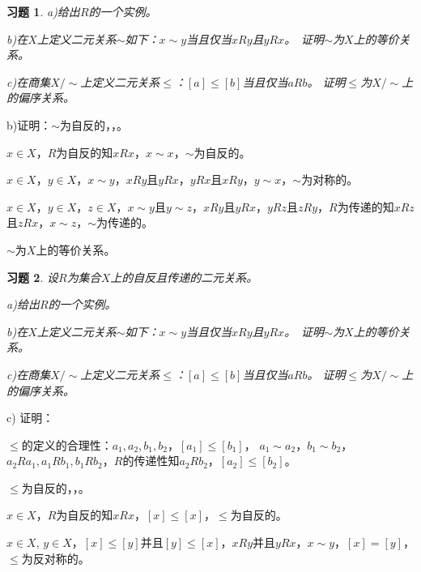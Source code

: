 \documentclass{beamer}
\newtheorem*{Exercise}{习题}
\begin{document}
\begin{CJK*}{UTF8}{gbsn}
\begin{frame}
\begin{Exercise}
  a)给出$R$的一个实例。

  b)在$X$上定义二元关系$\sim$如下：$x\sim y$当且仅当$x R y$且$y R x$。　证明$\sim$为$X$上的等价关系。

  c)在商集$X/\sim$上定义二元关系$\leq$：$[a]\leq [b]$当且仅当$aRb$。
  证明$\leq$为$X/\sim$上的偏序关系。  
\end{Exercise}

\justifying\let\raggedright\justifying\pause
b)证明：$\sim$为自反的，，。

  $x\in X$，$R$为自反的知$xRx$，$x\sim x$，$\sim$为自反的。

  $x\in X$，$y\in X$，$x\sim y$，$xRy$且$yRx$，$yRx$且$xRy$，$y\sim x$，$\sim$为对称的。

  $x\in X$，$y\in X$，$z\in X$，$x\sim y$且$y\sim z$，$xRy$且$yRx$，\pause $yRz$且$zRy$，$R$为传递的知$xRz$且$zRx$，$x\sim z$，$\sim$为传递的。

  $\sim$为$X$上的等价关系。

\end{frame}
\begin{frame}
  \begin{Exercise}
    设$R$为集合$X$上的自反且传递的二元关系。

  a)给出$R$的一个实例。

  b)在$X$上定义二元关系$\sim$如下：$x\sim y$当且仅当$x R y$且$y R x$。　证明$\sim$为$X$上的等价关系。

  c)在商集$X/\sim$上定义二元关系$\leq$：$[a]\leq [b]$当且仅当$aRb$。
  证明$\leq$为$X/\sim$上的偏序关系。  
\end{Exercise}

\justifying\let\raggedright\justifying
\pause
c) 证明：

$\leq$的定义的合理性：$a_1,a_2,b_1,b_2$，$[a_1]\leq [b_1]$，
\pause$a_1\sim a_2$，\pause$b_1\sim b_2$，$a_2 R a_1, a_1 R b_1, b_1 R b_2$，$R$的传递性知$a_2 R b_2$，$[a_2]\leq [b_2]$。

$\leq$为自反的，，。

  $x\in X$，$R$为自反的知$xRx$，$[x]\leq [x]$，$\leq$为自反的。

  $x\in X$, \pause$y\in X$，$[x]\leq [y]$并且$[y]\leq [x]$，$xRy$并且$yRx$，$x\sim y$，$[x]=[y]$，$\leq$为反对称的。


\end{frame}
\end{CJK*}
\end{document}

